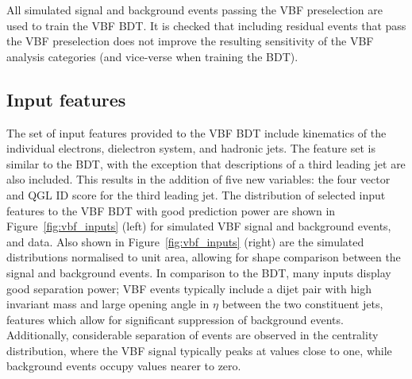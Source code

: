 \noindent All simulated signal and background events passing the VBF preselection are used to train the VBF BDT. It is checked that including residual \ggH events that pass the VBF preselection does not improve the resulting sensitivity of the VBF analysis categories (and vice-verse when training the \ggH BDT). 

\subsection{Input features}

The set of input features provided to the VBF BDT include kinematics of the individual electrons, dielectron system, and hadronic jets. The feature set is similar to the \ggH BDT, with the exception that descriptions of a third leading jet are also included. This results in the addition of five new variables: the four vector and QGL ID score for the third leading jet. The distribution of selected input features to the VBF BDT with good prediction power are shown in Figure~\ref{fig:vbf_inputs} (left) for simulated VBF signal and background events, and data. Also shown in Figure~\ref{fig:vbf_inputs} (right) are the simulated distributions normalised to unit area, allowing for shape comparison between the signal and background events. In comparison to the \ggH BDT, many inputs display good separation power; VBF events typically include a dijet pair with high invariant mass and large opening angle in $\eta$ between the two constituent jets, features which allow for significant suppression of background events. Additionally, considerable separation of events are observed in the centrality distribution, where the VBF signal typically peaks at values close to one, while background events occupy values nearer to zero.


